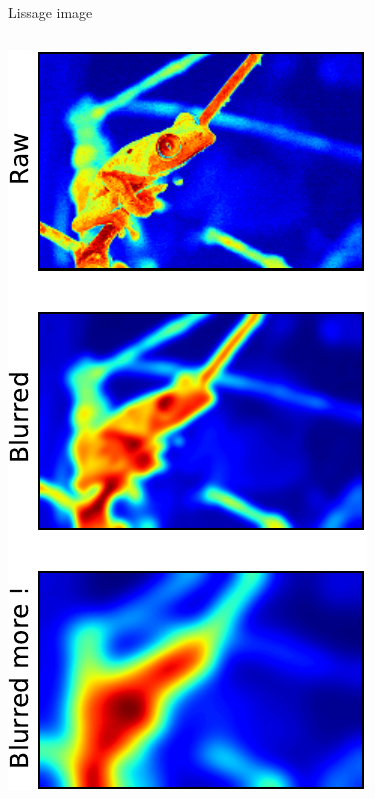 \documentclass[8pt,a4paper]{beamer}
\begin{document}
\begin{frame}[containsverbatim]{Lissage image}
  \begin{columns}
  \includegraphics[width=\textwidth]{figures/grenouille_lissage.pdf} 
  
    \end{columns}
\end{frame}  
\end{document}
